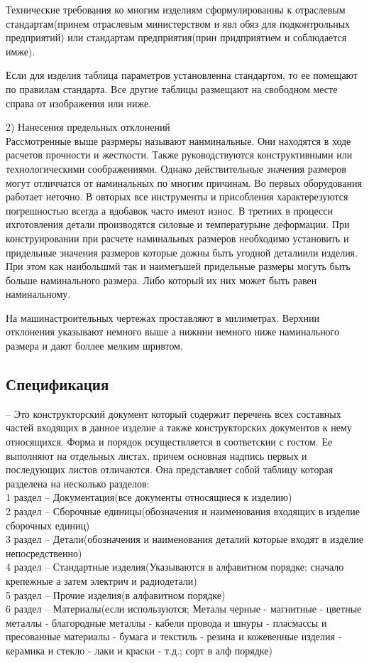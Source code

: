 \documentclass[a4paper, 12pt]{article}
\begin{document}
Технические требования ко многим изделиям сформулированны к отраслевым стандартам(принем отраслевым министерством и явл обяз для подконтрольных предприятий) или стандартам предприятия(прин придприятием и соблюдается имже).

Если для изделия таблица параметров установленна стандартом, то ее помещают по правилам стандарта. Все другие таблицы размещают на свободном месте справа от изображения или ниже.

2) Нанесения предельных отклонений\\
Рассмотренные выше разрмеры называют нанминальные. Они находятся в ходе расчетов прочности и жесткости. Также руководствуются конструктивными или технологическими соображениями. Однако действительные значения размеров могут отличчатся от наминальных по многим причинам. Во первых оборудования работает неточно. В овторых все инструменты и присобления характерезуются погрешностью всегда а вдобавок часто имеют износ. В третиих в процесси ихготовления детали производятся силовые и температурыне деформации. При конструировании при расчете наминальных размеров необходимо установить и придельные значения размеров которые дожны быть угодной деталиили изделия. При этом как наибольшмй так и наимегьшей придельные размеры могуть быть больше наминального размера. Либо который их них может быть равен наминальному.

На машинастроительных чертежах проставляют в милиметрах. Верхнии отклонения указывают немного выше а нижнии немного ниже наминального размера и дают боллее мелким шривтом. 

\subsection{Спецификация}
-- Это конструкторский документ который содержит перечень всех составных частей входящих в данное изделие а также конструкторских документов к нему относящихся. Форма и порядок осуществляется в соответскии   с гостом. Ее выполняют на отдельных листах, причем основная надпись первых и последующих листов отличаются. Она представляет собой таблицу которая разделена на несколько разделов:\\
1 раздел -- Документация(все документы относящиеся к изделию)\\
2 раздел -- Сборочные единицы(обозначения и наименования входящих в изделие сборочных единиц)\\
3 раздел -- Детали(обозначения и наименования деталий которые входят в изделие непосредственно)\\
4 раздел -- Стандартные изделия(Указываются в алфавитном порядке; сначало крепежные а затем электрич и радиодетали)\\
5 раздел -- Прочие изделия(в алфавитном порядке)\\
6 раздел -- Материалы(если используются; Металы черные - магнитные - цветные металлы - благородные металлы - кабели провода и шнуры - пласмассы и пресованные материалы - бумага и текстиль - резина и кожевенные изделия - керамика и стекло - лаки и краски - т.д.; сорт в алф порядке)\\
\end{document}
